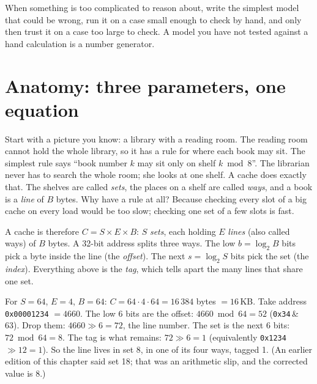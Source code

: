 \begin{rulebox}
When something is too complicated to reason about, write the simplest
model that could be wrong, run it on a case small enough to check by
hand, and only then trust it on a case too large to check. A model you
have not tested against a hand calculation is a number generator.
\end{rulebox}

\section{Anatomy: three parameters, one equation}
\label{sec:anatomy10}

Start with a picture you know: a library with a reading room. The
reading room cannot hold the whole library, so it has a rule for where
each book may sit. The simplest rule says ``book number \(k\) may sit
only on shelf \(k \bmod 8\)''. The librarian never has to search the
whole room; she looks at one shelf. A cache does exactly that. The
shelves are called \emph{sets}, the places on a shelf are called
\emph{ways}, and a book is a \emph{line} of \(B\) bytes. Why have
a rule at all? Because checking every slot of a big cache on every
load would be too slow; checking one set of a few slots is fast.

A cache is therefore \(C = S \times E \times B\): \(S\) \emph{sets},
each holding \(E\) \emph{lines} (also called ways) of \(B\) bytes. A
32-bit address splits three ways. The low \(b=\log_2 B\) bits pick a
byte inside the line (the \emph{offset}). The next \(s=\log_2 S\) bits
pick the set (the \emph{index}). Everything above is the \emph{tag},
which tells apart the many lines that share one set.





\begin{example}
For \(S{=}64\), \(E{=}4\), \(B{=}64\): \(C=64\cdot4\cdot64=16\,384\)
bytes \(=16\)\,KB. Take address \texttt{0x00001234} \(=4660\). The low
6 bits are the offset: \(4660 \bmod 64 = 52\) (\texttt{0x34}\,\&\,63).
Drop them: \(4660 \gg 6 = 72\), the line number. The set is the next 6
bits: \(72 \bmod 64 = 8\). The tag is what remains: \(72 \gg 6 = 1\)
(equivalently \texttt{0x1234}\,\(\gg 12 = 1\)). So the line lives in
set 8, in one of its four ways, tagged 1. (An earlier edition of this
chapter said set 18; that was an arithmetic slip, and the corrected
value is 8.)
\end{example}

